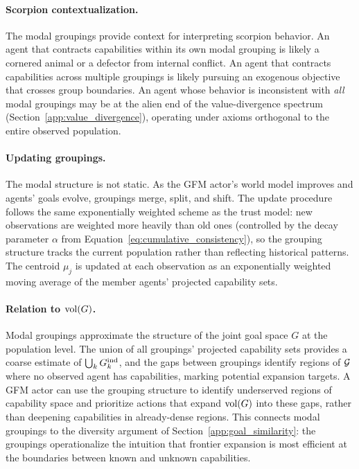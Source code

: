 \paragraph{Scorpion contextualization.} The modal groupings provide context for interpreting scorpion behavior. An agent that contracts capabilities within its own modal grouping is likely a cornered animal or a defector from internal conflict. An agent that contracts capabilities across multiple groupings is likely pursuing an exogenous objective that crosses group boundaries. An agent whose behavior is inconsistent with \emph{all} modal groupings may be at the alien end of the value-divergence spectrum (Section~\ref{app:value_divergence}), operating under axioms orthogonal to the entire observed population.

\paragraph{Updating groupings.} The modal structure is not static. As the GFM actor's world model improves and agents' goals evolve, groupings merge, split, and shift. The update procedure follows the same exponentially weighted scheme as the trust model: new observations are weighted more heavily than old ones (controlled by the decay parameter $\alpha$ from Equation~\ref{eq:cumulative_consistency}), so the grouping structure tracks the current population rather than reflecting historical patterns. The centroid $\mu_j$ is updated at each observation as an exponentially weighted moving average of the member agents' projected capability sets.

\paragraph{Relation to $\operatorname{vol}(G)$.} Modal groupings approximate the structure of the joint goal space $G$ at the population level. The union of all groupings' projected capability sets provides a coarse estimate of $\bigcup_k G_{k}^{\mathrm{ind}}$, and the gaps between groupings identify regions of $\mathcal{G}$ where no observed agent has capabilities, marking potential expansion targets. A GFM actor can use the grouping structure to identify underserved regions of capability space and prioritize actions that expand $\operatorname{vol}(G)$ into these gaps, rather than deepening capabilities in already-dense regions. This connects modal groupings to the diversity argument of Section~\ref{app:goal_similarity}: the groupings operationalize the intuition that frontier expansion is most efficient at the boundaries between known and unknown capabilities.
